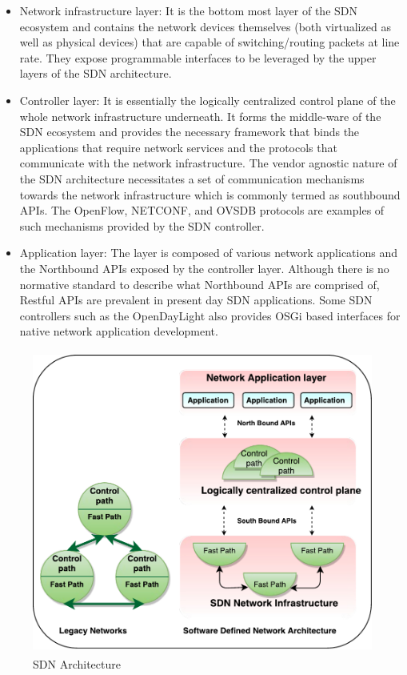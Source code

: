 \begin{itemize}
 \item Network infrastructure layer: It is the bottom most layer of the SDN ecosystem and contains the network devices themselves (both virtualized as well as physical devices) that are capable of switching/routing packets at line rate. They expose programmable interfaces to be leveraged by the upper layers of the SDN architecture.
 \item Controller layer: It is essentially the logically centralized control plane of the whole network infrastructure underneath. It forms the middle-ware of the SDN ecosystem and provides the necessary framework that binds the applications that require network services and the protocols that communicate with the network infrastructure. The vendor agnostic nature of the SDN architecture necessitates a set of communication mechanisms towards the network infrastructure which is commonly termed as southbound APIs. The OpenFlow, NETCONF, and OVSDB protocols are examples of such mechanisms provided by the SDN controller. 
 \item Application layer: The layer is composed of various network applications and the Northbound APIs exposed by the controller layer. Although there is no normative standard to describe what  Northbound APIs are comprised of, Restful APIs are prevalent in present day SDN applications. Some SDN controllers such as the OpenDayLight also provides OSGi based interfaces for native network application development.
\end{itemize}


\begin{figure}[H]
 \centering
 \caption{SDN Architecture}
 \includegraphics[height=10cm]{SDN-Architecture05.pdf}
\end{figure}

